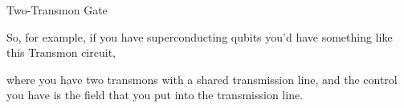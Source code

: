 \documentclass[compress, aspectratio=169]{beamer}
\begin{document}
\begin{frame}{Two-Transmon Gate}
{    So, for example, if you have superconducting qubits you'd have something like this Transmon circuit,

    where you have two transmons with a shared transmission line, and the control you have is the field that you put into the transmission line.
  }
\end{frame}


\end{document}
